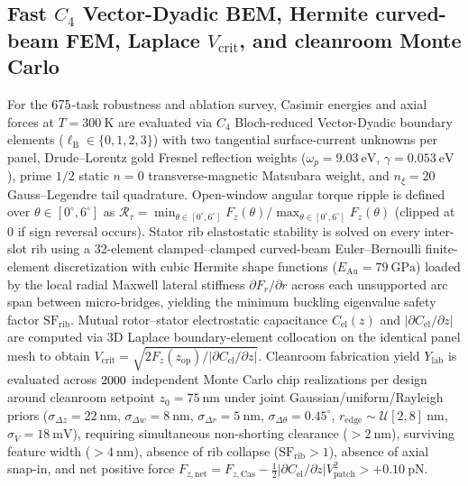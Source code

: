 \documentclass[pdflatex,sn-nature]{sn-jnl}
\begin{document}
\subsection*{Fast $C_4$ Vector-Dyadic BEM, Hermite curved-beam FEM, Laplace $V_{\mathrm{crit}}$, and cleanroom Monte Carlo}
For the $675{}$-task robustness and ablation survey, Casimir energies and axial forces at $T=300\ \mathrm{K}$ are evaluated via $C_4$ Bloch-reduced Vector-Dyadic boundary elements ($\ell_{\mathrm{B}} \in \{0,1,2,3\}$) with two tangential surface-current unknowns per panel, Drude--Lorentz gold Fresnel reflection weights ($\omega_p = 9.03\ \mathrm{eV}$, $\gamma = 0.053\ \mathrm{eV}$)\cite{rakic1998}, prime $1/2$ static $n=0$ transverse-magnetic Matsubara weight, and $n_\xi = 20$ Gauss--Legendre tail quadrature. Open-window angular torque ripple is defined over $\theta \in [0^\circ, 6^\circ]$ as $\mathcal{R}_\tau = \min_{\theta \in [0^\circ,6^\circ]} F_z(\theta) / \max_{\theta \in [0^\circ,6^\circ]} F_z(\theta)$ (clipped at $0$ if sign reversal occurs). Stator rib elastostatic stability is solved on every inter-slot rib using a 32-element clamped--clamped curved-beam Euler--Bernoulli finite-element discretization with cubic Hermite shape functions ($E_{\mathrm{Au}} = 79\ \mathrm{GPa}$) loaded by the local radial Maxwell lateral stiffness $\partial F_r/\partial r$ across each unsupported arc span between micro-bridges, yielding the minimum buckling eigenvalue safety factor $\mathrm{SF}_{\mathrm{rib}}$. Mutual rotor--stator electrostatic capacitance $C_{\mathrm{el}}(z)$ and $|\partial C_{\mathrm{el}}/\partial z|$ are computed via 3D Laplace boundary-element collocation on the identical panel mesh to obtain $V_{\mathrm{crit}} = \sqrt{2 F_z(z_{\mathrm{op}}) / |\partial C_{\mathrm{el}}/\partial z|}$. Cleanroom fabrication yield $Y_{\mathrm{lab}}$ is evaluated across $2000{}$ independent Monte Carlo chip realizations per design around cleanroom setpoint $z_0 = 75\ \mathrm{nm}$ under joint Gaussian/uniform/Rayleigh priors ($\sigma_{\Delta z}=22\ \mathrm{nm}$, $\sigma_{\Delta w}=8\ \mathrm{nm}$, $\sigma_{\Delta r}=5\ \mathrm{nm}$, $\sigma_{\Delta\theta}=0.45^\circ$, $r_{\mathrm{edge}} \sim \mathcal{U}[2,8]\ \mathrm{nm}$, $\sigma_V = 18\ \mathrm{mV}$), requiring simultaneous non-shorting clearance ($>2\ \mathrm{nm}$), surviving feature width ($>4\ \mathrm{nm}$), absence of rib collapse ($\mathrm{SF}_{\mathrm{rib}}>1$), absence of axial snap-in, and net positive force $F_{z,\mathrm{net}} = F_{z,\mathrm{Cas}} - \frac{1}{2}|\partial C_{\mathrm{el}}/\partial z|V_{\mathrm{patch}}^2 > +0.10\ \mathrm{pN}$.
\end{document}
